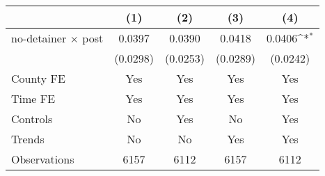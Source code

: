 {
\def\sym#1{\ifmmode^{#1}\else\(^{#1}\)\fi}
\begin{tabular}{l*{4}{c}}
\hline\hline
                    &\multicolumn{1}{c}{(1)}         &\multicolumn{1}{c}{(2)}         &\multicolumn{1}{c}{(3)}         &\multicolumn{1}{c}{(4)}         \\
\hline
no-detainer $\times$ post&      0.0397         &      0.0390         &      0.0418         &      0.0406\sym{*}  \\
                    &    (0.0298)         &    (0.0253)         &    (0.0289)         &    (0.0242)         \\
[1em]
County FE           &         Yes         &         Yes         &         Yes         &         Yes         \\
[1em]
Time FE             &         Yes         &         Yes         &         Yes         &         Yes         \\
[1em]
Controls            &          No         &         Yes         &          No         &         Yes         \\
[1em]
Trends              &          No         &          No         &         Yes         &         Yes         \\
\hline
Observations        &        6157         &        6112         &        6157         &        6112         \\
\hline\hline
\end{tabular}
}
